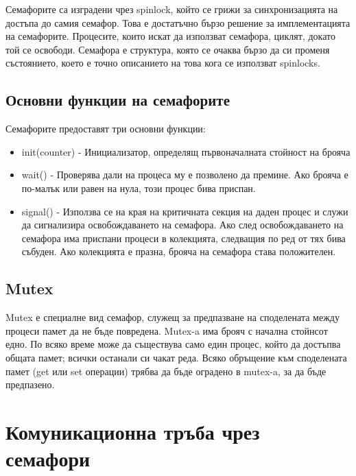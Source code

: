 \documentclass[fleqn,12pt]{article}
\begin{document}
    Семафорите са изградени чрез spinlock, който се грижи за синхронизацията на достъпа до самия семафор. Това е достатъчно бързо решение за имплементацията на семафорите. Процесите, които искат да използват семафора, циклят, докато той се освободи. Семафора е структура, която се очаква бързо да си променя състоянието, което е точно описанието на това кога се използват spinlocks.


\subsection{Основни функции на семафорите}
    Семафорите предоставят три основни функции:

\begin{itemize}
    \item init(counter) - Инициализатор, определящ първоначалната стойност на брояча
    \item wait() - Проверява дали на процеса му е позволено да премине. Ако брояча е по-малък или равен на нула, този процес бива приспан.
    \item signal() - Използва се на края на критичната секция на даден процес и служи да сигнализира освобождаването на семафора. Ако след освобождаването на семафора има приспани процеси в колекцията, следващия по ред от тях бива събуден. Ако колекцията е празна, брояча на семафора става положителен.
\end{itemize}


\subsection{Mutex}
    Mutex е специалне вид семафор, служещ за предпазване на споделената между процеси памет да не бъде повредена. Mutex-a има брояч с начална стойнсот едно. По всяко време може да съществува само един процес, който да достъпва общата памет; всички останали си чакат реда. Всяко обръщение към споделената памет (get или set операции) трябва да бъде оградено в mutex-a, за да бъде предпазено.


\section{Комуникационна тръба чрез семафори}
\end{document}
